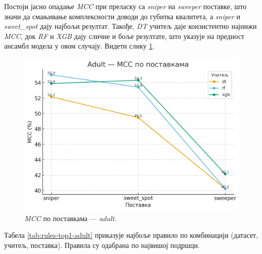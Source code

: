 Постоји јасно опадање \textit{MCC} при преласку са \textit{sniper} на \textit{sweeper} поставке, што значи да смањивање комплексности доводи до губитка квалитета, а \textit{sniper} и \textit{sweet\_spot} дају најбољи резултат. Такође, \textit{DT} учитељ даје конзистентно најнижи \textit{MCC}, док \textit{RF} и \textit{XGB} дају сличне и боље резултате, што указује на предност ансамбл модела у овом случају. Видети слику \ref{fig:adult-mcc}.
\begin{figure}[H]
  \centering
  \includegraphics[width=.85\linewidth]{images/charts/adult-mcc.png}
  \caption{\textit{MCC} по поставкама — \textit{adult}.}
  \label{fig:adult-mcc}
\end{figure}

Табела \ref{tab:rules-top1-adult} приказује најбоље правило по комбинацији (датасет, учитељ, поставка). Правила су одабрана по највишој подршци.

\begin{table}[H]
\centering
{}
\caption{Најбоље правило за скуп \textit{adult} по комбинацији (учитељ, поставка), бирано по највишој подршци.}
\label{tab:rules-top1-adult}
\end{table}

